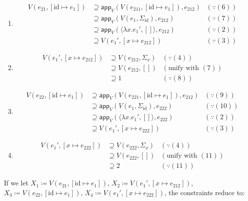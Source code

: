 \documentclass{article}
\begin{document}
\begin{enumerate}
  \item
        \begin{align*}
          V(e_{21},[\text{id}\mapsto e_{1}])
          &\supseteq \mathsf{app}_{V}(V(e_{211},[\text{id}\mapsto e_{1}]),e_{212}) & (\because (6))\\
          &\supseteq \mathsf{app}_{V}(V(e_{1},\Sigma_{\text{id}}),e_{212}) & (\because (7))\\
          &\supseteq \mathsf{app}_{V}(\langle \lambda x.e_{1}',[] \rangle, e_{212}) & (\because (2))\\
          &\supseteq V(e_{1}',[x\mapsto e_{212}]) & (\because (3))
        \end{align*}
  \item
        \begin{align*}
          V(e_{1}',[x\mapsto e_{212}])
          &\supseteq V(e_{212},\Sigma_{x}) & (\because (4))\\
          &\supseteq V(e_{212},[]) & (\text{unify with }(7))\\
          &\supseteq 1 & (\because (8))
        \end{align*}
  \item
        \begin{align*}
          V(e_{22},[\text{id}\mapsto e_{1}])
          &\supseteq \mathsf{app}_{V}(V(e_{221},[\text{id}\mapsto e_{1}]),e_{212}) & (\because (9))\\
          &\supseteq \mathsf{app}_{V}(V(e_{1},\Sigma_{\text{id}}),e_{222}) & (\because (10))\\
          &\supseteq \mathsf{app}_{V}(\langle \lambda x.e_{1}',[] \rangle, e_{222}) & (\because (2))\\
          &\supseteq V(e_{1}',[x\mapsto e_{222}]) & (\because (3))
        \end{align*}
  \item
        \begin{align*}
          V(e_{1}',[x\mapsto e_{222}])
          &\supseteq V(e_{222},\Sigma_{x}) & (\because (4))\\
          &\supseteq V(e_{222},[]) & (\text{unify with }(11))\\
          &\supseteq 2 & (\because (11))
        \end{align*}
\end{enumerate}

If we let $X_{1}\coloneq V(e_{21},[\text{id}\mapsto e_{1}])$, $X_{2}\coloneq V(e_{1}',[x\mapsto e_{212}])$, $X_{3}\coloneq V(e_{22},[\text{id}\mapsto e_{1}])$, $X_{4}\coloneq V(e_{1}',[x\mapsto e_{222}])$, the constraints reduce to:
\end{document}
